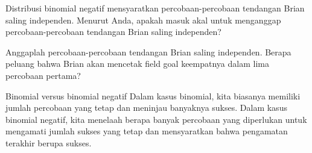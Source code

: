 \begin{exercisewrap}
\begin{nexercise}
Distribusi binomial negatif mensyaratkan percobaan-percobaan tendangan Brian saling independen. Menurut Anda, apakah masuk akal untuk menganggap percobaan-percobaan tendangan Brian saling independen?\footnotemark
\end{nexercise}
\end{exercisewrap}

\begin{exercisewrap}
\begin{nexercise}
Anggaplah percobaan-percobaan tendangan Brian saling independen. Berapa peluang bahwa Brian akan mencetak field goal keempatnya dalam lima percobaan pertama?\footnotemark
\end{nexercise}
\end{exercisewrap}

\D{\newpage}

\begin{onebox}{Binomial versus binomial negatif}
  Dalam kasus binomial, kita biasanya memiliki jumlah percobaan
  yang tetap dan meninjau banyaknya sukses.
  Dalam kasus binomial negatif, kita menelaah berapa banyak percobaan
  yang diperlukan untuk mengamati jumlah sukses yang tetap dan
  mensyaratkan bahwa pengamatan terakhir berupa sukses.
\end{onebox}

